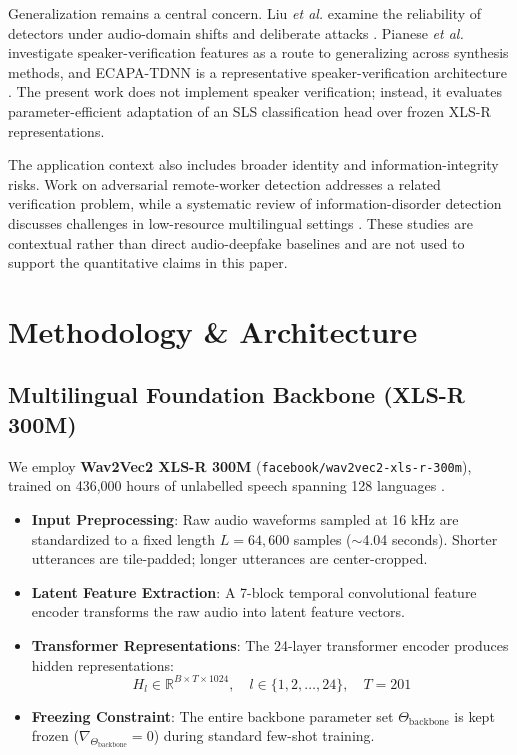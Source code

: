 \documentclass[conference]{IEEEtran}
\begin{document}
Generalization remains a central concern. Liu \textit{et al.} examine the reliability of detectors under audio-domain shifts and deliberate attacks \cite{liu2024reliably}. Pianese \textit{et al.} investigate speaker-verification features as a route to generalizing across synthesis methods, and ECAPA-TDNN is a representative speaker-verification architecture \cite{pianese2022speaker,desplanques2020ecapa}. The present work does not implement speaker verification; instead, it evaluates parameter-efficient adaptation of an SLS classification head over frozen XLS-R representations.

The application context also includes broader identity and information-integrity risks. Work on adversarial remote-worker detection addresses a related verification problem, while a systematic review of information-disorder detection discusses challenges in low-resource multilingual settings \cite{hussain2026tool,woldegiorgis2026review}. These studies are contextual rather than direct audio-deepfake baselines and are not used to support the quantitative claims in this paper.

\section{Methodology \& Architecture}

\subsection{Multilingual Foundation Backbone (XLS-R 300M)}

We employ \textbf{Wav2Vec2 XLS-R 300M} (\texttt{facebook/wav2vec2-xls-r-300m}), trained on 436,000 hours of unlabelled speech spanning 128 languages \cite{babu2022xls}.

\begin{itemize}
    \item \textbf{Input Preprocessing}: Raw audio waveforms sampled at 16 kHz are standardized to a fixed length $L = 64{,}600$ samples ($\sim$4.04 seconds). Shorter utterances are tile-padded; longer utterances are center-cropped.

    \item \textbf{Latent Feature Extraction}: A 7-block temporal convolutional feature encoder transforms the raw audio into latent feature vectors.

    \item \textbf{Transformer Representations}: The 24-layer transformer encoder produces hidden representations:
    \begin{equation}
        H_l \in \mathbb{R}^{B \times T \times 1024}, \quad
        l \in \{1, 2, \dots, 24\}, \quad T = 201
    \end{equation}

    \item \textbf{Freezing Constraint}: The entire backbone parameter set $\Theta_{\text{backbone}}$ is kept frozen ($\nabla_{\Theta_{\text{backbone}}} = 0$) during standard few-shot training.
\end{itemize}
\end{document}
